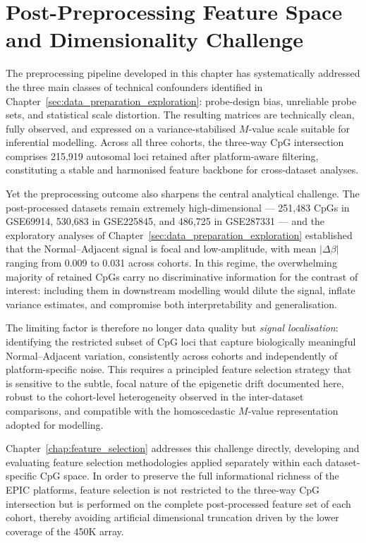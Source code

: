 \section{Post-Preprocessing Feature Space and Dimensionality Challenge}
\label{sec:postproc_rationale}

The preprocessing pipeline developed in this chapter has systematically
addressed the three main classes of technical confounders identified in
Chapter~\ref{sec:data_preparation_exploration}: probe-design bias,
unreliable probe sets, and statistical scale distortion. The resulting
matrices are technically clean, fully observed, and expressed on a
variance-stabilised $M$-value scale suitable for inferential modelling.
Across all three cohorts, the three-way CpG intersection comprises
215{,}919 autosomal loci retained after platform-aware filtering,
constituting a stable and harmonised feature backbone for cross-dataset
analyses.

Yet the preprocessing outcome also sharpens the central analytical
challenge. The post-processed datasets remain extremely high-dimensional
--- 251{,}483 CpGs in GSE69914, 530{,}683 in GSE225845, and 486{,}725
in GSE287331 --- and the exploratory analyses of
Chapter~\ref{sec:data_preparation_exploration} established that the
Normal--Adjacent signal is focal and low-amplitude, with mean
$|\Delta\beta|$ ranging from 0.009 to 0.031 across cohorts. In this
regime, the overwhelming majority of retained CpGs carry no
discriminative information for the contrast of interest: including them
in downstream modelling would dilute the signal, inflate variance
estimates, and compromise both interpretability and generalisation.

The limiting factor is therefore no longer data quality but
\emph{signal localisation}: identifying the restricted subset of CpG
loci that capture biologically meaningful Normal--Adjacent variation,
consistently across cohorts and independently of platform-specific
noise. This requires a principled feature selection strategy that is
sensitive to the subtle, focal nature of the epigenetic drift documented
here, robust to the cohort-level heterogeneity observed in the
inter-dataset comparisons, and compatible with the homoscedastic
$M$-value representation adopted for modelling.

Chapter~\ref{chap:feature_selection} addresses this challenge directly,
developing and evaluating feature selection methodologies applied
separately within each dataset-specific CpG space. In order to preserve
the full informational richness of the EPIC platforms, feature selection
is not restricted to the three-way CpG intersection but is performed on
the complete post-processed feature set of each cohort, thereby avoiding
artificial dimensional truncation driven by the lower coverage of the
450K array.
